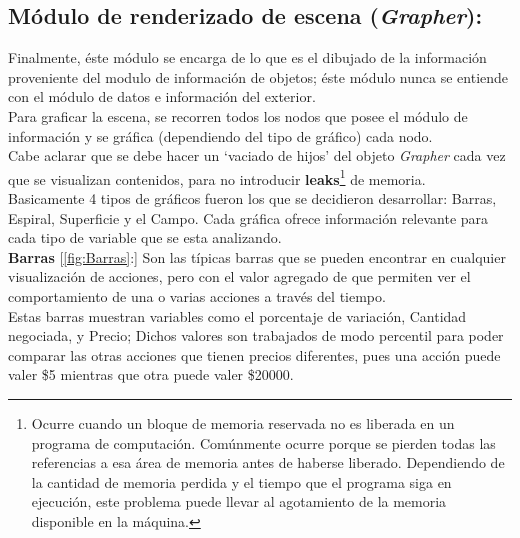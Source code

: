 \subsection{Módulo de renderizado de escena (\emph{Grapher}):}

Finalmente, éste módulo se encarga de lo que es el dibujado de la información proveniente del modulo de información de objetos; éste módulo nunca se entiende con el módulo de datos e información del exterior.\\
 
Para graficar la escena, se recorren todos los nodos que posee el módulo de información y se gráfica (dependiendo del tipo de gráfico) cada nodo.\\


Cabe aclarar que se debe hacer un `vaciado de hijos' del objeto \emph{Grapher} cada vez que se visualizan contenidos, para no introducir \textbf{leaks}\footnote{Ocurre cuando un bloque de memoria reservada no es liberada en un programa de computación. Comúnmente ocurre porque se pierden todas las referencias a esa área de memoria antes de haberse liberado. Dependiendo de la cantidad de memoria perdida y el tiempo que el programa siga en ejecución, este problema puede llevar al agotamiento de la memoria disponible en la máquina.} de memoria.\\



Basicamente 4 tipos de gráficos fueron los que se decidieron desarrollar: Barras, Espiral, Superficie y el Campo. Cada gráfica ofrece información relevante para cada tipo de variable que se esta analizando. \\

\textbf{Barras} [\ref{fig:Barras}:] Son las típicas barras que se pueden encontrar en cualquier visualización de acciones, pero con el valor agregado de que permiten ver el comportamiento de una o varias acciones a través del tiempo.\\

Estas barras muestran variables como el porcentaje de variación, Cantidad negociada, y Precio; Dichos valores son trabajados de modo percentil para poder comparar las otras acciones que tienen precios diferentes, pues una acción puede valer \$5 mientras que otra puede valer \$20000.\\


